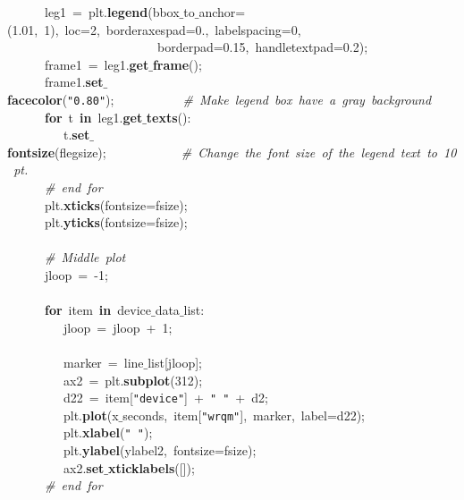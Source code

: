 \mbox{}\ \ \ \ \ \ leg1\ =\ plt.\textbf{legend}(bbox$\_$to$\_$anchor=(1.01,\ 1),\ loc=2,\ borderaxespad=0.,\ labelspacing=0,\  \\
\mbox{}\ \ \ \ \ \ \ \ \ \ \ \ \ \ \ \ \ \ \ \ \ \ \ \ borderpad=0.15,\ handletextpad=0.2); \\
\mbox{}\ \ \ \ \ \ frame1\ =\ leg1.\textbf{get$\_$frame}(); \\
\mbox{}\ \ \ \ \ \ frame1.\textbf{set$\_$facecolor}(\texttt{"{}0.80"{}});\ \ \ \ \ \ \ \ \ \ \ \textit{\#\ Make\ legend\ box\ have\ a\ gray\ background} \\
\mbox{}\ \ \ \ \ \ \textbf{for}\ t\ \textbf{in}\ leg1.\textbf{get$\_$texts}(): \\
\mbox{}\ \ \ \ \ \ \ \ \ t.\textbf{set$\_$fontsize}(flegsize);\ \ \ \ \ \ \ \ \ \ \ \ \textit{\#\ Change\ the\ font\ size\ of\ the\ legend\ text\ to\ 10\ pt.} \\
\mbox{}\ \ \ \ \ \ \textit{\#\ end\ for} \\
\mbox{}\ \ \ \ \ \ plt.\textbf{xticks}(fontsize=fsize); \\
\mbox{}\ \ \ \ \ \ plt.\textbf{yticks}(fontsize=fsize); \\
\mbox{}\ \ \ \ \ \  \\
\mbox{}\ \ \ \ \ \ \textit{\#\ Middle\ plot} \\
\mbox{}\ \ \ \ \ \ jloop\ =\ -1; \\
\mbox{}\ \ \ \ \ \  \\
\mbox{}\ \ \ \ \ \ \textbf{for}\ item\ \textbf{in}\ device$\_$data$\_$list: \\
\mbox{}\ \ \ \ \ \ \ \ \ jloop\ =\ jloop\ +\ 1; \\
\mbox{}\ \ \ \ \ \ \ \ \  \\
\mbox{}\ \ \ \ \ \ \ \ \ marker\ =\ line$\_$list[jloop]; \\
\mbox{}\ \ \ \ \ \ \ \ \ ax2\ =\ plt.\textbf{subplot}(312); \\
\mbox{}\ \ \ \ \ \ \ \ \ d22\ =\ item[\texttt{"{}device"{}}]\ +\ \texttt{"{}\ "{}}\ +\ d2; \\
\mbox{}\ \ \ \ \ \ \ \ \ plt.\textbf{plot}(x$\_$seconds,\ item[\texttt{"{}wrqm"{}}],\ marker,\ label=d22); \\
\mbox{}\ \ \ \ \ \ \ \ \ plt.\textbf{xlabel}(\texttt{"{}\ "{}}); \\
\mbox{}\ \ \ \ \ \ \ \ \ plt.\textbf{ylabel}(ylabel2,\ fontsize=fsize); \\
\mbox{}\ \ \ \ \ \ \ \ \ ax2.\textbf{set$\_$xticklabels}([]); \\
\mbox{}\ \ \ \ \ \ \textit{\#\ end\ for} \\

